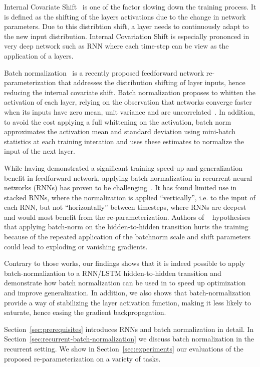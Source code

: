 \documentclass{article} %
\begin{document}
Internal Covariate Shift~\cite{shimodaira2000improving,batchnorm} is one of the factor slowing down the training process.
It is defined as the shifting of the layers activations due to the change in network parameters.
Due to this distribtion shift, a layer needs to continuously adapt to the new input distribution.
Internal Covariation Shift is especially prononced in very deep network such as RNN where each time-step can be view as the application of a layers.

Batch normalization~\cite{batchnorm} is a recently proposed feedforward network re-parameterization that addresses the distribution shifting of layer inputs, hence reducing the internal covariate shift.
Batch normalization proposes to whitten the activation of each layer, relying on the observation that networks converge faster when its inputs
have zero mean, unit variance and are uncorrelated~\cite{efficientbackprop}.
In addition, to avoid the cost applying a full whittening on the activation,
batch norm approximates the activation mean and standard deviation using mini-batch statistics at each training interation
and uses these estimates to normalize the input of the next layer.

While having demonstrated a significant training speed-up and generalization benefit in feedforward network, applying batch normalization in recurrent neural networks (RNNs) has proven to be challenging~\cite{cesar,baidu}.
It has found limited use in stacked RNNs, where the normalization is applied ``vertically'', i.e. to the input of each RNN, but not ``horizontally'' between timesteps, where RNNs are deepest and would most benefit from the re-parameterization.
Authors of ~\cite{cesar} hypothesises that applying batch-norm on the hidden-to-hidden transition hurts the training
because of the repeated application of the batchnorm scale and shift parameters could lead to exploding or vanishing gradients.

Contrary to those works, our findings shows that it is indeed possible to apply batch-normalization to a RNN/LSTM hidden-to-hidden transition and demonstrate how batch normalization can be used in to speed up optimization and improve generalization. In addition, we also shows that batch-normalization provide a way of stabilizing the layer activation function, making it less likely
to saturate, hence easing the gradient backpropagation.


Section~\ref{sec:prerequisites} introduces RNNs and batch normalization in detail.
In Section~\ref{sec:recurrent-batch-normalization} we discuss batch normalization in the recurrent setting.
We show in Section~\ref{sec:experiments} our evaluations of the proposed re-parameterization on a variety of tasks.
\end{document}
